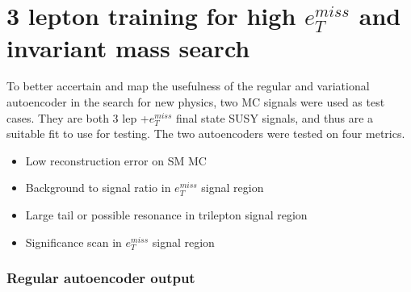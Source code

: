 
\section{3 lepton training for high $e_T^{miss}$ and invariant mass search}\label{sec:3lep}


To better accertain and map the usefulness of the regular and variational autoencoder in the search for 
new physics, two MC signals were used as test cases. They are both 3 lep +$e_T^{miss}$ final state SUSY signals,
and thus are a suitable fit to use for testing. The two autoencoders were tested on four metrics. 
\begin{itemize}
    \item Low reconstruction error on SM MC
    \item Background to signal ratio in $e_T^{miss}$ signal region
    \item Large tail or possible resonance in trilepton signal region
    \item Significance scan in $e_T^{miss}$ signal region
\end{itemize}



\subsubsection*{Regular autoencoder output}\label{sec:3lep_reg}


